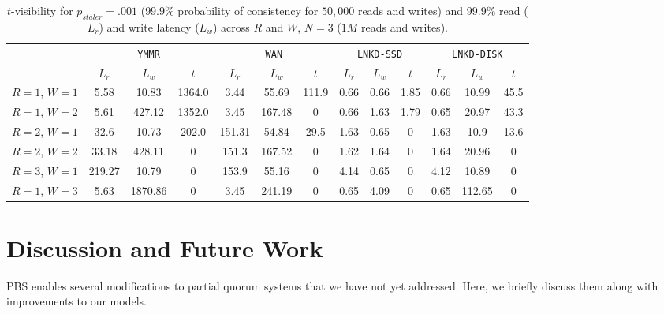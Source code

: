 \documentclass{vldb}
\begin{document}
\begin{table}
\centering
\begin{tabular}{c|c|c|c|c|c|c|c|c|c|c|c|c|}
\cline{2-13}
& \multicolumn{3}{|c|}{\texttt{YMMR}} & \multicolumn{3}{|c|}{\texttt{WAN}} & \multicolumn{3}{|c|}{\texttt{LNKD-SSD}} & \multicolumn{3}{|c|}{\texttt{LNKD-DISK}}\\
&\multicolumn{1}{|c}{$L_r$}  & \multicolumn{1}{c}{$L_w$} & \multicolumn{1}{c|}{$t$} &  \multicolumn{1}{|c}{$L_r$} & \multicolumn{1}{c}{$L_w$} & \multicolumn{1}{c|}{$t$} &  \multicolumn{1}{|c}{$L_r$} & \multicolumn{1}{c}{$L_w$} & \multicolumn{1}{c|}{$t$} &  \multicolumn{1}{|c}{$L_r$} & \multicolumn{1}{c}{$L_w$} & \multicolumn{1}{c|}{$t$} \\\hline
\multicolumn{1}{|c|}{$R$$=$$1$, $W$$=$$1$}
& 5.58 & 10.83 & 1364.0 & 3.44 & 55.69 & 111.9 & 0.66 & 0.66 & 1.85 & 0.66 & 10.99 & 45.5 \\
\multicolumn{1}{|c|}{$R$$=$$1$, $W$$=$$2$}
& 5.61 & 427.12 & 1352.0 & 3.45 & 167.48 & 0 & 0.66 & 1.63 & 1.79 & 0.65 & 20.97 & 43.3 \\
\multicolumn{1}{|c|}{$R$$=$$2$, $W$$=$$1$}
& 32.6 & 10.73 & 202.0 & 151.31 & 54.84 & 29.5 & 1.63 & 0.65 & 0 & 1.63 & 10.9 & 13.6 \\
\multicolumn{1}{|c|}{$R$$=$$2$, $W$$=$$2$}
& 33.18 & 428.11 & 0 & 151.3 & 167.52 & 0 & 1.62 & 1.64 & 0 & 1.64 & 20.96 & 0 \\
\multicolumn{1}{|c|}{$R$$=$$3$, $W$$=$$1$}
& 219.27 & 10.79 & 0 & 153.9 & 55.16 & 0 & 4.14 & 0.65 & 0 & 4.12 & 10.89 & 0 \\
\multicolumn{1}{|c|}{$R$$=$$1$, $W$$=$$3$}
& 5.63 & 1870.86 & 0 & 3.45 & 241.19 & 0 & 0.65 & 4.09 & 0 & 0.65 & 112.65 & 0 \\
\hline
\end{tabular}
\caption{$t$-visibility for $p_{staler} = .001$ ($99.9\%$ probability
  of consistency for $50,000$ reads and writes) and $99.9\%$ read
  ($L_r$) and write latency ($L_w$) across $R$ and $W$, $N$$=$$3$
  ($1M$ reads and writes).}
\label{table:lat-stale}
\end{table}


\section{Discussion and Future Work}
\label{sec:discussion}

PBS enables several modifications to partial quorum systems that we
have not yet addressed.  Here, we briefly discuss them along with
improvements to our models.
\end{document}
